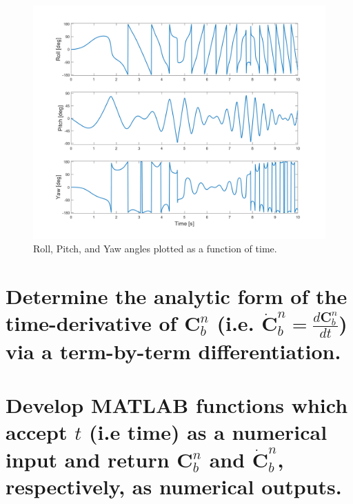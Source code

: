 \documentclass[12pt,letterpaper, onecolumn]{exam}
\begin{document}
\begin{questions}
\begin{parts}
        \begin{figure}[!h]
            \centering
            \includegraphics[width=0.8\linewidth]{Euler_Angles.png}
            \caption{Roll, Pitch, and Yaw angles plotted as a function of time.}
            \label{fig:euler}
        \end{figure}

    \end{parts}
    \clearpage
    \begin{parts}
        \part{Determine the analytic form of the time-derivative of $\mathbf{C}^n_b$ (i.e. $\dot{\mathbf{C}}^n_b = \frac{d\mathbf{C}^n_b}{dt}$) via a term-by-term differentiation.}



        \part{Develop MATLAB functions which accept $t$ (i.e time) as a numerical input and return $\mathbf{C}^n_b$ and $\dot{\mathbf{C}}^n_b$, respectively, as numerical outputs.}


\end{parts}
\end{questions}
\end{document}
